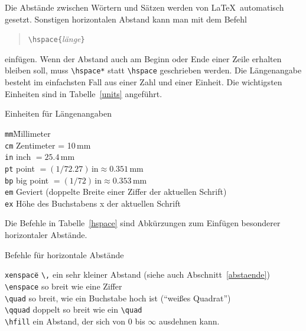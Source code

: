 Die Abstände zwischen Wörtern und Sätzen werden von \LaTeX\ 
automatisch gesetzt.
Sonstigen horizontalen Abstand kann man mit dem Befehl
\begin{verse}
\verb|\hspace{|\textit{länge}\verb|}|
\end{verse}
einfügen.
Wenn der Abstand auch am Beginn oder Ende einer Zeile
erhalten bleiben soll, muss \verb|\hspace*| statt \verb|\hspace|
geschrieben werden.
Die Längenangabe besteht im einfachsten Fall aus einer Zahl
und einer Einheit.  Die wichtigsten Einheiten sind in
Tabelle~\ref{units} angeführt.
\begin{table}[b]
\caption{Einheiten für Längenangaben} \label{units}
\oben{11cm}
\begin{tabbing}
\texttt{mm}\qquad \= Millimeter                               \\
\texttt{cm} \> Zentimeter = 10\,mm                            \\
\texttt{in} \> inch \(= 25.4\,\mathrm{mm} \)                  \\
\texttt{pt} \> point \( =(1/72.27)\,\mathrm{in}
                        \approx 0.351\,\mathrm{mm}\)          \\
\texttt{bp} \> big point \( =(1/72)\,\mathrm{in}
                            \approx 0.353\,\mathrm{mm} \)      \\
\texttt{em} \> Geviert (doppelte Breite einer Ziffer der aktuellen Schrift)\\
\texttt{ex} \> Höhe des Buchstabens x der aktuellen Schrift
\end{tabbing}                    
\unten
\end{table}
Die Befehle in Tabelle~\ref{hspace} sind Abkürzungen zum Einfügen
besonderer horizontaler Abstände.
\begin{table}[t]
\caption{Befehle für horizontale Abstände} \label{hspace}
\oben{13cm}
\begin{tabbing}
\texttt{xenspace}\qquad \= \kill
\verb|\,|       \> ein sehr kleiner Abstand (siehe auch Abschnitt~\ref{abstaende})\\
\verb|\enspace| \> so breit wie eine Ziffer \\
\verb|\quad|    \> so breit, wie ein Buchstabe hoch ist
                   ("`weißes Quadrat"') \\
\verb|\qquad|   \> doppelt so breit wie ein \verb|\quad| \\
\verb|\hfill|   \> ein Abstand, der sich von 0 bis \(\infty\)
                   ausdehnen kann.
\end{tabbing}
\unten
\end{table}
